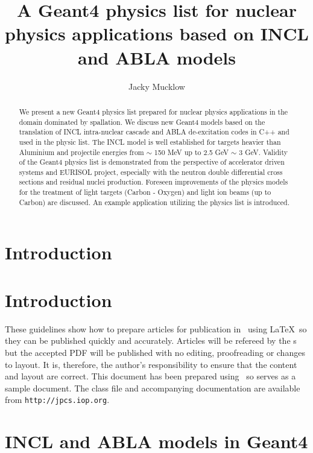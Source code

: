\documentclass[a4paper]{jpconf}
\begin{document}
\title{A Geant4 physics list for nuclear physics applications based on INCL and ABLA models}

\author{Jacky Mucklow}

\address{Production Editor, \jpcs, \iopp, Dirac House, Temple Back, Bristol BS1~6BE, UK}


\begin{abstract}
We present a new Geant4 physics list prepared for nuclear physics applications
in the domain dominated by spallation.
We discuss new Geant4 models based on the translation of
INCL intra-nuclear cascade and ABLA de-excitation codes in C++
and used in the physic list.
The INCL model is well established for targets heavier than Aluminium
and projectile energies from $\sim$ 150 MeV up to 2.5 GeV $\sim$ 3 GeV.
Validity of the Geant4 physics list is demonstrated from the perspective of accelerator driven systems
and EURISOL project, especially with the neutron double differential cross sections and residual
nuclei production.
Foreseen improvements of the physics models for the treatment of light targets (Carbon - Oxygen)
and light ion beams (up to Carbon) are discussed.
An example application utilizing the physics list is introduced.
\end{abstract}

\section{Introduction}


\section{Introduction}
These guidelines show how to prepare articles for publication in \jpcs\ using \LaTeX\ so they can be published quickly and accurately. Articles will be refereed by the \corg s but the accepted PDF will be published with no editing, proofreading or changes to layout. It is, therefore, the author's responsibility to ensure that the content and layout are correct.  This document has been prepared using \cls\ so serves as a sample document. The class file and accompanying documentation are available from \verb"http://jpcs.iop.org".

\section{INCL and ABLA models in Geant4} \label{sec:models}

\end{document}
